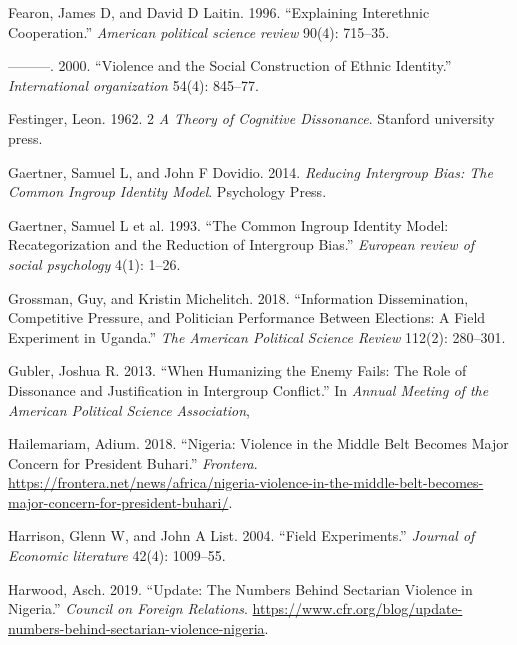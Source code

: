 \documentclass[11pt]{article}
\begin{document}
\begin{cslreferences}
\leavevmode\hypertarget{ref-fearon1996explaining}{}%
Fearon, James D, and David D Laitin. 1996. ``Explaining Interethnic
Cooperation.'' \emph{American political science review} 90(4): 715--35.

\leavevmode\hypertarget{ref-fearon2000violence}{}%
---------. 2000. ``Violence and the Social Construction of Ethnic
Identity.'' \emph{International organization} 54(4): 845--77.

\leavevmode\hypertarget{ref-festinger1962cognitiveDissonance}{}%
Festinger, Leon. 1962. 2 \emph{A Theory of Cognitive Dissonance}.
Stanford university press.

\leavevmode\hypertarget{ref-gaertner2014reducing}{}%
Gaertner, Samuel L, and John F Dovidio. 2014. \emph{Reducing Intergroup
Bias: The Common Ingroup Identity Model}. Psychology Press.

\leavevmode\hypertarget{ref-gaertner1993common}{}%
Gaertner, Samuel L et al. 1993. ``The Common Ingroup Identity Model:
Recategorization and the Reduction of Intergroup Bias.'' \emph{European
review of social psychology} 4(1): 1--26.

\leavevmode\hypertarget{ref-grossman2018information}{}%
Grossman, Guy, and Kristin Michelitch. 2018. ``Information
Dissemination, Competitive Pressure, and Politician Performance Between
Elections: A Field Experiment in Uganda.'' \emph{The American Political
Science Review} 112(2): 280--301.

\leavevmode\hypertarget{ref-gubler2013humanizing}{}%
Gubler, Joshua R. 2013. ``When Humanizing the Enemy Fails: The Role of
Dissonance and Justification in Intergroup Conflict.'' In \emph{Annual
Meeting of the American Political Science Association},

\leavevmode\hypertarget{ref-frontera2018nigeria}{}%
Hailemariam, Adium. 2018. ``Nigeria: Violence in the Middle Belt Becomes
Major Concern for President Buhari.'' \emph{Frontera}.
\url{https://frontera.net/news/africa/nigeria-violence-in-the-middle-belt-becomes-major-concern-for-president-buhari/}.

\leavevmode\hypertarget{ref-harrison2004field}{}%
Harrison, Glenn W, and John A List. 2004. ``Field Experiments.''
\emph{Journal of Economic literature} 42(4): 1009--55.

\leavevmode\hypertarget{ref-council2019nigeria}{}%
Harwood, Asch. 2019. ``Update: The Numbers Behind Sectarian Violence in
Nigeria.'' \emph{Council on Foreign Relations}.
\url{https://www.cfr.org/blog/update-numbers-behind-sectarian-violence-nigeria}.


\end{cslreferences}
\end{document}

